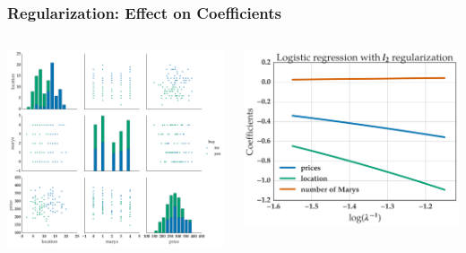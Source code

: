 \documentclass[11pt]{beamer}
\begin{document}
\begin{frame}
  \frametitle{Regularization: Effect on Coefficients}
  \begin{columns}
    \begin{column}{0.5\linewidth}
      \includegraphics[scale=0.2]{figures/houses_grid.png}
    \end{column}
    \begin{column}{0.5\linewidth}
      \vspace{-0.6cm}
      \begin{center}
        \includegraphics[scale=0.2]{figures/logistic_regression_l2_coef_path.png}

\end{center}
\end{column}
\end{columns}
\end{frame}
\end{document}
